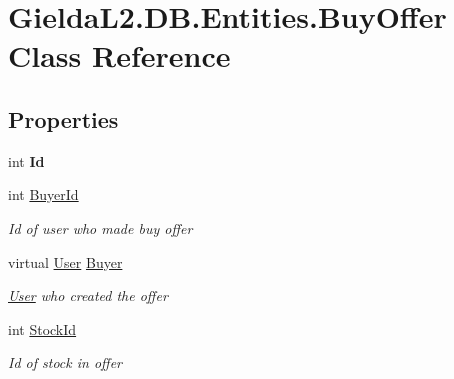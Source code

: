 \hypertarget{class_gielda_l2_1_1_d_b_1_1_entities_1_1_buy_offer}{}\section{Gielda\+L2.\+D\+B.\+Entities.\+Buy\+Offer Class Reference}
\label{class_gielda_l2_1_1_d_b_1_1_entities_1_1_buy_offer}
\subsection*{Properties}
\begin{DoxyCompactItemize}
\item 
\mbox{\label{class_gielda_l2_1_1_d_b_1_1_entities_1_1_buy_offer_a0666def76ea84b00ee490077f717a1f3}} 
int {\bfseries Id}
\item 
int \mbox{\hyperlink{class_gielda_l2_1_1_d_b_1_1_entities_1_1_buy_offer_abb6f21bdad5351166b691cb26609e8a9}{Buyer\+Id}}
\begin{DoxyCompactList}\small\item\em Id of user who made buy offer \end{DoxyCompactList}\item 
virtual \mbox{\hyperlink{class_gielda_l2_1_1_d_b_1_1_entities_1_1_user}{User}} \mbox{\hyperlink{class_gielda_l2_1_1_d_b_1_1_entities_1_1_buy_offer_a320008007550b1d84295e6a1152563d4}{Buyer}}
\begin{DoxyCompactList}\small\item\em \mbox{\hyperlink{class_gielda_l2_1_1_d_b_1_1_entities_1_1_user}{User}} who created the offer \end{DoxyCompactList}\item 
int \mbox{\hyperlink{class_gielda_l2_1_1_d_b_1_1_entities_1_1_buy_offer_a81fb970bdb19d1ffca604fbeafd8d80a}{Stock\+Id}}
\begin{DoxyCompactList}\small\item\em Id of stock in offer \end{DoxyCompactList}\item 

\end{DoxyCompactItemize}

